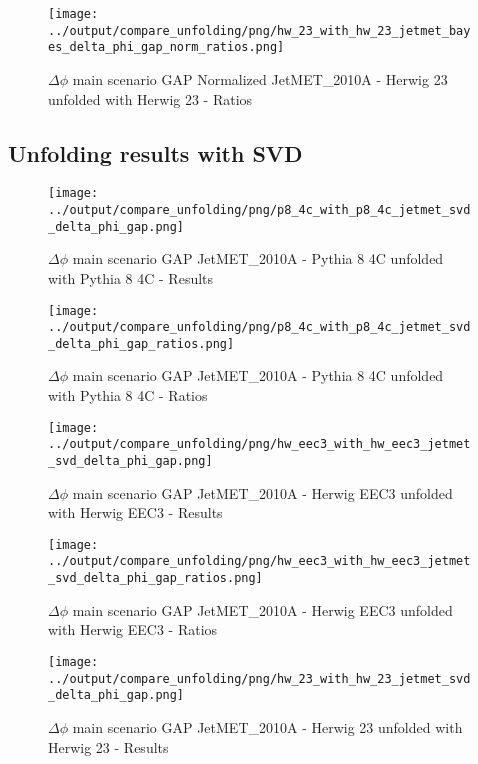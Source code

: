 \documentclass[11pt]{book}
\begin{document}
\begin{figure}[ht]
\centering
\texttt{[image: ../output/compare\_unfolding/png/hw\_23\_with\_hw\_23\_jetmet\_bayes\_delta\_phi\_gap\_norm\_ratios.png]}
\caption{$\Delta\phi$ main scenario GAP Normalized JetMET\_2010A - Herwig 23 unfolded with Herwig 23 - Ratios}
\label{hw_23_hw_23_jetmet_bayes_delta_phi_gap_norm_b}
\end{figure}


\clearpage
\subsection{Unfolding results with SVD}

\begin{figure}[ht]
\centering
\texttt{[image: ../output/compare\_unfolding/png/p8\_4c\_with\_p8\_4c\_jetmet\_svd\_delta\_phi\_gap.png]}
\caption{$\Delta\phi$ main scenario GAP JetMET\_2010A - Pythia 8 4C unfolded with Pythia 8 4C - Results}
\label{p8_p8_jetmet_svd_delta_phi_gap_a}
\end{figure}

\begin{figure}[ht]
\centering
\texttt{[image: ../output/compare\_unfolding/png/p8\_4c\_with\_p8\_4c\_jetmet\_svd\_delta\_phi\_gap\_ratios.png]}
\caption{$\Delta\phi$ main scenario GAP JetMET\_2010A - Pythia 8 4C unfolded with Pythia 8 4C - Ratios}
\label{p8_p8_jetmet_svd_delta_phi_gap_b}
\end{figure}

\begin{figure}[ht]
\centering
\texttt{[image: ../output/compare\_unfolding/png/hw\_eec3\_with\_hw\_eec3\_jetmet\_svd\_delta\_phi\_gap.png]}
\caption{$\Delta\phi$ main scenario GAP JetMET\_2010A - Herwig EEC3 unfolded with Herwig EEC3 - Results}
\label{hw_eec3_hw_eec3_jetmet_svd_delta_phi_gap_a}
\end{figure}

\begin{figure}[ht]
\centering
\texttt{[image: ../output/compare\_unfolding/png/hw\_eec3\_with\_hw\_eec3\_jetmet\_svd\_delta\_phi\_gap\_ratios.png]}
\caption{$\Delta\phi$ main scenario GAP JetMET\_2010A - Herwig EEC3 unfolded with Herwig EEC3 - Ratios}
\label{hw_eec3_hw_eec3_jetmet_svd_delta_phi_gap_b}
\end{figure}

\begin{figure}[ht]
\centering
\texttt{[image: ../output/compare\_unfolding/png/hw\_23\_with\_hw\_23\_jetmet\_svd\_delta\_phi\_gap.png]}
\caption{$\Delta\phi$ main scenario GAP JetMET\_2010A - Herwig 23 unfolded with Herwig 23 - Results}
\label{hw_23_hw_23_jetmet_svd_delta_phi_gap_a}
\end{figure}
\end{document}
